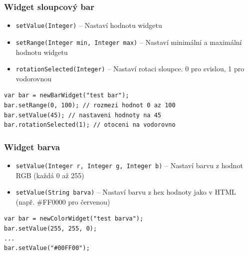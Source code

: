 \documentclass[12pt, a4paper, oneside]{article}
\newcommand{\It}{\textit}  %
\begin{document}
\subsubsection*{Widget sloupcový bar}
\begin{itemize}
    \item {\color{blue}\verb/setValue(Integer)/} -- Nastaví hodnotu widgetu
    \item {\color{blue}\verb/setRange(Integer min, Integer max)/} -- Nastaví minimální a maximální hodnotu widgetu
    \item {\color{blue}\verb/rotationSelected(Integer)/} -- Nastaví rotaci sloupce. 0 pro svislou, 1 pro vodorovnou
\end{itemize}

\noindent\begin{minipage}{\textwidth}
\begin{lstlisting}[caption=Nastavení hodnot widgetu \It{sloupcový bar}]
var bar = newBarWidget("test bar");
bar.setRange(0, 100); // rozmezi hodnot 0 az 100
bar.setValue(45); // nastaveni hodnoty na 45
bar.rotationSelected(1); // otoceni na vodorovno
\end{lstlisting}
\end{minipage}

\subsubsection*{Widget barva}
\begin{itemize}
    \item {\color{blue}\verb/setValue(Integer r, Integer g, Integer b)/} -- Nastaví barvu z hodnot RGB (každá 0 až 255)
    \item {\color{blue}\verb/setValue(String barva)/} -- Nastaví barvu z hex hodnoty jako v HTML (např. \#FF0000 pro červenou)
\end{itemize}

\noindent\begin{minipage}{\textwidth}
\begin{lstlisting}[caption=Nastavení hodnot widgetu \It{barva}]
var bar = newColorWidget("test barva");
bar.setValue(255, 255, 0);
...
bar.setValue("#00FF00");
\end{lstlisting}
\end{minipage}
\end{document}
